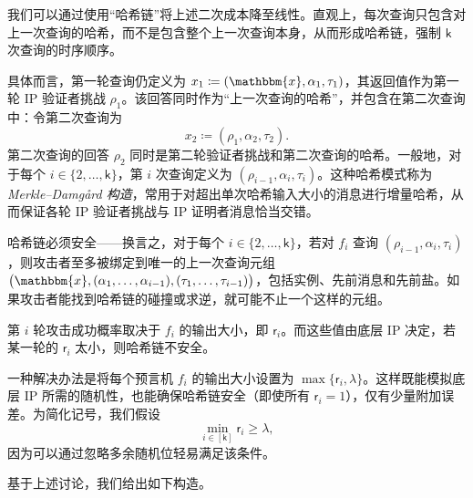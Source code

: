 \documentclass[american,singlepageview]{snargs-book-zh}
\newcommand{\DefineEqual}{\coloneqq}
\newcommand{\Instance}{\mathbbm{x}}
\newcommand{\ProtoSalt}{\tau}
\newcommand{\ProtoRoundComplexity}{\mathsf{k}}
\newcommand{\ProtoRandomnessComplexity}{\mathsf{r}}
\newcommand{\RoundIndex}{i}
\newcommand{\IPRoundComplexity}{\ProtoRoundComplexity}
\newcommand{\IPRandomnessComplexity}{\ProtoRandomnessComplexity}
\newcommand{\IPProverMessage}{\alpha}
\newcommand{\IPVerifierRandomMessage}{\rho}
\newcommand{\ROFunction}{f}
\newcommand{\SecurityParameter}{\lambda}
\newcommand{\ROQuery}{x}
\newcommand{\RandSaltString}{\ProtoSalt}
\newcommand{\FSFirstQuery}{(\Instance,\IPProverMessage_{1},\RandSaltString_{1})}
\newcommand{\SlowFSLaterQuery}[1]{\big(\Instance,(\IPProverMessage_{1},\dots,\IPProverMessage_{#1}),(\RandSaltString_{1},\dots,\RandSaltString_{#1})\big)}
\newcommand{\FastFSLaterQuery}[1]{(\IPVerifierRandomMessage_{#1-1},\IPProverMessage_{#1},\RandSaltString_{#1})}
\begin{document}
我们可以通过使用“哈希链”将上述二次成本降至线性。直观上，每次查询只包含对上一次查询的哈希，而不是包含整个上一次查询本身，从而形成哈希链，强制 $\IPRoundComplexity$ 次查询的时序顺序。

具体而言，第一轮查询仍定义为 $\ROQuery_{1} \DefineEqual \FSFirstQuery$，其返回值作为第一轮 IP 验证者挑战 $\IPVerifierRandomMessage_{1}$。该回答同时作为“上一次查询的哈希”，并包含在第二次查询中：令第二次查询为
\[
\ROQuery_{2} \DefineEqual (\IPVerifierRandomMessage_{1},\IPProverMessage_{2},\RandSaltString_{2}).
\]
第二次查询的回答 $\IPVerifierRandomMessage_{2}$ 同时是第二轮验证者挑战和第二次查询的哈希。一般地，对于每个 $\RoundIndex\in\{2,\dots,\IPRoundComplexity\}$，第 $\RoundIndex$ 次查询定义为 $\FastFSLaterQuery{\RoundIndex}$。这种哈希模式称为 \emph{Merkle--Damg\r{a}rd 构造}，常用于对超出单次哈希输入大小的消息进行增量哈希，从而保证各轮 IP 验证者挑战与 IP 证明者消息恰当交错。

哈希链必须安全——换言之，对于每个 $\RoundIndex\in\{2,\dots,\IPRoundComplexity\}$，若对 $\ROFunction_{\RoundIndex}$ 查询 $\FastFSLaterQuery{\RoundIndex}$，则攻击者至多被绑定到唯一的上一次查询元组 $\SlowFSLaterQuery{\RoundIndex-1}$，包括实例、先前消息和先前盐。如果攻击者能找到哈希链的碰撞或求逆，就可能不止一个这样的元组。

第 $\RoundIndex$ 轮攻击成功概率取决于 $\ROFunction_{\RoundIndex}$ 的输出大小，即 $\IPRandomnessComplexity_{\RoundIndex}$。而这些值由底层 IP 决定，若某一轮的 $\IPRandomnessComplexity_{\RoundIndex}$ 太小，则哈希链不安全。

一种解决办法是将每个预言机 $\ROFunction_{\RoundIndex}$ 的输出大小设置为 $\max\{\IPRandomnessComplexity_{\RoundIndex},\SecurityParameter\}$。这样既能模拟底层 IP 所需的随机性，也能确保哈希链安全（即使所有 $\IPRandomnessComplexity_{\RoundIndex}=1$），仅有少量附加误差。为简化记号，我们假设
\[
\min_{\RoundIndex\in[\IPRoundComplexity]}\IPRandomnessComplexity_{\RoundIndex}\ge\SecurityParameter,
\]
因为可以通过忽略多余随机位轻易满足该条件。

基于上述讨论，我们给出如下构造。
\end{document}
